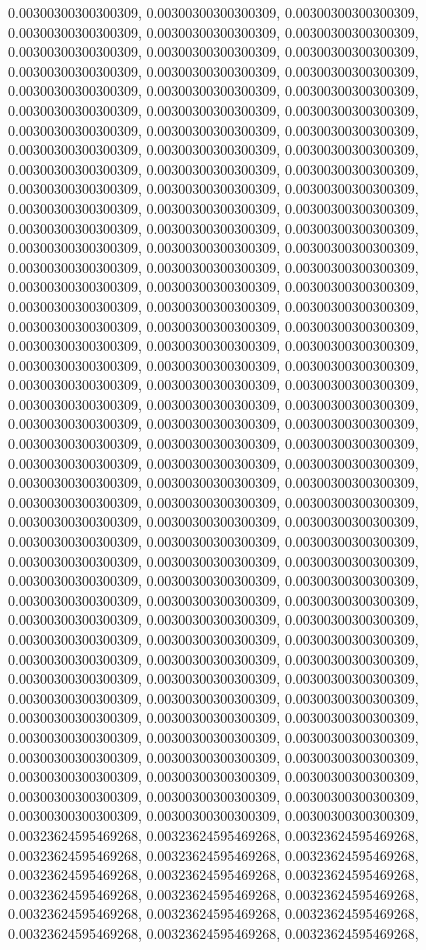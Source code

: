\documentclass[
  ,man]{apa6}
\begin{document}
0.00300300300300309, 0.00300300300300309, 0.00300300300300309, 0.00300300300300309, 0.00300300300300309, 0.00300300300300309, 0.00300300300300309, 0.00300300300300309, 0.00300300300300309, 0.00300300300300309, 0.00300300300300309, 0.00300300300300309, 0.00300300300300309, 0.00300300300300309, 0.00300300300300309, 0.00300300300300309, 0.00300300300300309, 0.00300300300300309, 0.00300300300300309, 0.00300300300300309, 0.00300300300300309, 0.00300300300300309, 0.00300300300300309, 0.00300300300300309,
0.00300300300300309, 0.00300300300300309, 0.00300300300300309, 0.00300300300300309, 0.00300300300300309, 0.00300300300300309, 0.00300300300300309, 0.00300300300300309, 0.00300300300300309, 0.00300300300300309, 0.00300300300300309, 0.00300300300300309, 0.00300300300300309, 0.00300300300300309, 0.00300300300300309, 0.00300300300300309, 0.00300300300300309, 0.00300300300300309, 0.00300300300300309, 0.00300300300300309, 0.00300300300300309, 0.00300300300300309, 0.00300300300300309, 0.00300300300300309,
0.00300300300300309, 0.00300300300300309, 0.00300300300300309, 0.00300300300300309, 0.00300300300300309, 0.00300300300300309, 0.00300300300300309, 0.00300300300300309, 0.00300300300300309, 0.00300300300300309, 0.00300300300300309, 0.00300300300300309, 0.00300300300300309, 0.00300300300300309, 0.00300300300300309, 0.00300300300300309, 0.00300300300300309, 0.00300300300300309, 0.00300300300300309, 0.00300300300300309, 0.00300300300300309, 0.00300300300300309, 0.00300300300300309, 0.00300300300300309,
0.00300300300300309, 0.00300300300300309, 0.00300300300300309, 0.00300300300300309, 0.00300300300300309, 0.00300300300300309, 0.00300300300300309, 0.00300300300300309, 0.00300300300300309, 0.00300300300300309, 0.00300300300300309, 0.00300300300300309, 0.00300300300300309, 0.00300300300300309, 0.00300300300300309, 0.00300300300300309, 0.00300300300300309, 0.00300300300300309, 0.00300300300300309, 0.00300300300300309, 0.00300300300300309, 0.00300300300300309, 0.00300300300300309, 0.00300300300300309,
0.00300300300300309, 0.00300300300300309, 0.00300300300300309, 0.00300300300300309, 0.00300300300300309, 0.00300300300300309, 0.00300300300300309, 0.00300300300300309, 0.00300300300300309, 0.00300300300300309, 0.00300300300300309, 0.00300300300300309, 0.00300300300300309, 0.00300300300300309, 0.00300300300300309, 0.00300300300300309, 0.00300300300300309, 0.00300300300300309, 0.00300300300300309, 0.00300300300300309, 0.00300300300300309, 0.00300300300300309, 0.00300300300300309, 0.00300300300300309,
0.00300300300300309, 0.00300300300300309, 0.00300300300300309, 0.00300300300300309, 0.00300300300300309, 0.00300300300300309, 0.00323624595469268, 0.00323624595469268, 0.00323624595469268, 0.00323624595469268, 0.00323624595469268, 0.00323624595469268, 0.00323624595469268, 0.00323624595469268, 0.00323624595469268, 0.00323624595469268, 0.00323624595469268, 0.00323624595469268, 0.00323624595469268, 0.00323624595469268, 0.00323624595469268, 0.00323624595469268, 0.00323624595469268, 0.00323624595469268,
\end{document}
